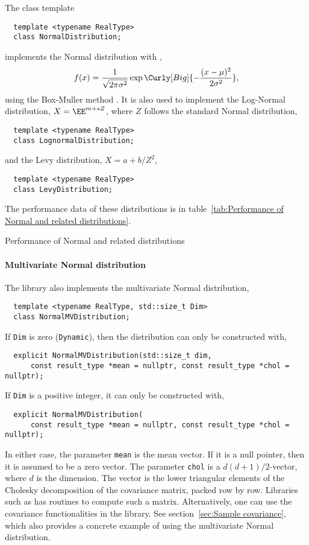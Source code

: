 The class template
\begin{Verbatim}
  template <typename RealType>
  class NormalDistribution;
\end{Verbatim}
implements the Normal distribution with \pdf,
\begin{equation*}
  f(x) =
  \frac{1}{\sqrt{2\pi\sigma^2}}\exp\Curly[Big]{-\frac{(x-\mu)^2}{2\sigma^2}},
\end{equation*}
using the Box-Muller method \parencite{Box:1958hv}. It is also used to
implement the Log-Normal distribution, $X = \EE^{m + s Z}$, where $Z$ follows
the standard Normal distribution,
\begin{Verbatim}
  template <typename RealType>
  class LognormalDistribution;
\end{Verbatim}
and the Levy distribution, $X = a + b / Z^2$,
\begin{Verbatim}
  template <typename RealType>
  class LevyDistribution;
\end{Verbatim}
The performance data of these distributions is in table~\ref{tab:Performance of
  Normal and related distributions}.

\begin{table}
  \caption{Performance of Normal and related distributions}
  \label{tab:Performance of Normal and related distributions}
\end{table}

\paragraph{Multivariate Normal distribution}

The library also implements the multivariate Normal distribution,
\begin{Verbatim}
  template <typename RealType, std::size_t Dim>
  class NormalMVDistribution;
\end{Verbatim}
If \verb|Dim| is zero (\verb|Dynamic|), then the distribution can only be
constructed with,
\begin{Verbatim}
  explicit NormalMVDistribution(std::size_t dim,
      const result_type *mean = nullptr, const result_type *chol = nullptr);
\end{Verbatim}
If \verb|Dim| is a positive integer, it can only be constructed with,
\begin{Verbatim}
  explicit NormalMVDistribution(
      const result_type *mean = nullptr, const result_type *chol = nullptr);
\end{Verbatim}
In either case, the parameter \verb|mean| is the mean vector. If it is a null
pointer, then it is assumed to be a zero vector. The parameter \verb|chol| is a
$d(d + 1)/2$-vector, where $d$ is the dimension. The vector is the lower
triangular elements of the Cholesky decomposition of the covariance matrix,
packed row by row. Libraries such as \lapack has routines to compute such a
matrix. Alternatively, one can use the covariance functionalities in the
library. See section~\ref{sec:Sample covariance}, which also provides a
concrete example of using the multivariate Normal distribution.

